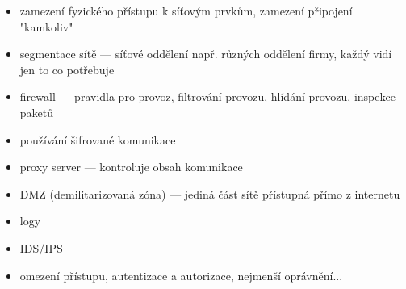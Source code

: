 \begin{itemize}
	\begin{itemize}
		\item zamezení fyzického přístupu k síťovým prvkům, zamezení připojení "kamkoliv"
		\item segmentace sítě --- síťové oddělení např. různých oddělení firmy, každý vidí jen to co potřebuje
		\item firewall --- pravidla pro provoz, filtrování provozu, hlídání provozu, inspekce paketů
		\item používání šifrované komunikace
		\item proxy server --- kontroluje obsah komunikace
		\item DMZ (demilitarizovaná zóna) --- jediná část sítě přístupná přímo z internetu
		\item logy
		\item IDS/IPS
		\item omezení přístupu, autentizace a autorizace, nejmenší oprávnění...
	\end{itemize}
\end{itemize}